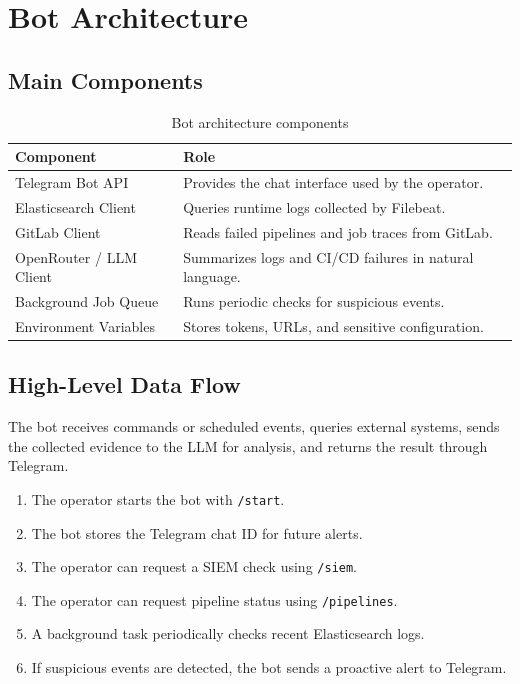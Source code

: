 \documentclass[12pt,a4paper]{report}
\begin{document}
\chapter{Bot Architecture}

\section{Main Components}

\begin{table}[H]
\centering
\caption{Bot architecture components}
\begin{tabular}{p{4cm}p{9cm}}
\toprule
\textbf{Component} & \textbf{Role} \\
\midrule
Telegram Bot API & Provides the chat interface used by the operator. \\
Elasticsearch Client & Queries runtime logs collected by Filebeat. \\
GitLab Client & Reads failed pipelines and job traces from GitLab. \\
OpenRouter / LLM Client & Summarizes logs and CI/CD failures in natural language. \\
Background Job Queue & Runs periodic checks for suspicious events. \\
Environment Variables & Stores tokens, URLs, and sensitive configuration. \\
\bottomrule
\end{tabular}
\end{table}

\section{High-Level Data Flow}

The bot receives commands or scheduled events, queries external systems, sends the collected evidence to the LLM for analysis, and returns the result through Telegram.

\begin{enumerate}[leftmargin=*]
    \item The operator starts the bot with \texttt{/start}.
    \item The bot stores the Telegram chat ID for future alerts.
    \item The operator can request a SIEM check using \texttt{/siem}.
    \item The operator can request pipeline status using \texttt{/pipelines}.
    \item A background task periodically checks recent Elasticsearch logs.
    \item If suspicious events are detected, the bot sends a proactive alert to Telegram.
\end{enumerate}
\end{document}
